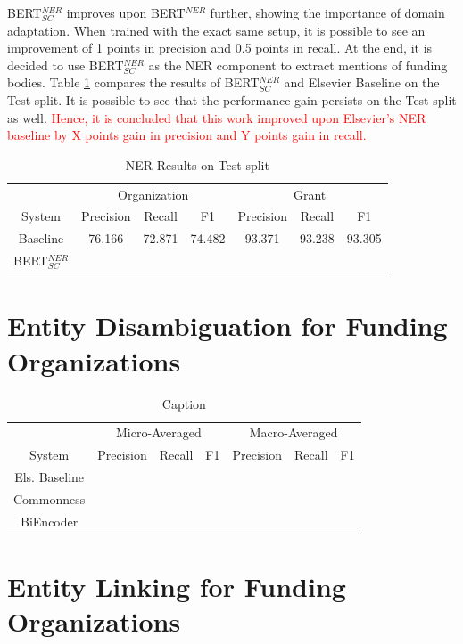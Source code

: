 \documentclass{report}
\theoremstyle{definition}
\theoremstyle{remark}
\begin{document}
BERT$^{NER}_{SC}$ improves upon BERT$^{NER}$ further, showing the importance of domain adaptation. When trained with the exact same setup, it is possible to see an improvement of 1 points in precision and 0.5 points in recall. At the end, it is decided to use BERT$^{NER}_{SC}$ as the NER component to extract mentions of funding bodies. Table \ref{tab:all_ner_results_test} compares the results of BERT$^{NER}_{SC}$ and Elsevier Baseline on the Test split. It is possible to see that the performance gain persists on the Test split as well. \textcolor{red}{Hence, it is concluded that this work improved upon Elsevier's NER baseline by X points gain in precision and Y points gain in recall.}

\begin{table}[h!]
    \centering
    \begin{tabular}{c| c c c| c c c}
    &\multicolumn{3}{c|}{Organization}&\multicolumn{3}{c}{Grant} \\
    System&Precision&Recall&F1&Precision&Recall&F1\\
    \hline
    Baseline &  76.166 & 72.871  & 74.482 & 93.371   & 93.238  & 93.305
 \\[0.7ex]
    BERT$^{NER}_{SC}$ & 
  \\[0.7ex]
    \end{tabular}
    \caption{NER Results on Test split}
    \label{tab:all_ner_results_test}
\end{table}

\section{Entity Disambiguation for Funding Organizations}

\begin{table}[h!]
    \centering
    \begin{tabular}{c|ccc|ccc}
    &\multicolumn{3}{c|}{Micro-Averaged}&\multicolumn{3}{c}{Macro-Averaged}\\
    System  & Precision & Recall & F1 & Precision & Recall & F1   \\
    \hline
    Els. Baseline     & &&&&&\\
    Commonness   &&&&&&\\
    BiEncoder  &&&&&&\\
    \end{tabular}
    \caption{Caption}
    \label{tab:my_label}
\end{table}

\section{Entity Linking for Funding Organizations}
\end{document}
